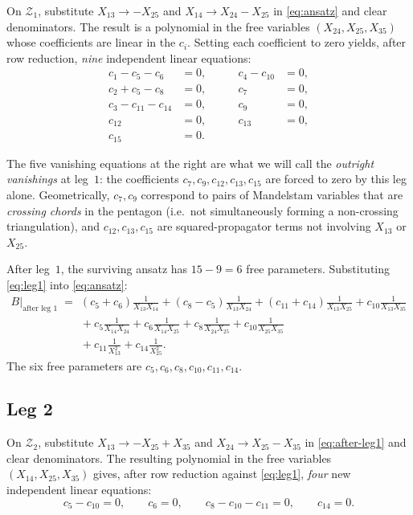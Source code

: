 \documentclass[11pt]{article}
\theoremstyle{plain}
\theoremstyle{definition}
\newcommand{\cZ}{\mathcal{Z}}
\begin{document}
On $\cZ_1$, substitute $X_{13} \to -X_{25}$ and $X_{14} \to X_{24} - X_{25}$ in
\eqref{eq:ansatz} and clear denominators. The result is a polynomial in the free
variables $(X_{24}, X_{25}, X_{35})$ whose coefficients are linear in the $c_i$.
Setting each coefficient to zero yields, after row reduction, \emph{nine} independent
linear equations:
\begin{equation}
\begin{aligned}
c_1 - c_5 - c_6 &= 0, &\qquad c_4 - c_{10} &= 0, \\
c_2 + c_5 - c_8 &= 0, &\qquad c_7 &= 0, \\
c_3 - c_{11} - c_{14} &= 0, &\qquad c_9 &= 0, \\
c_{12} &= 0, &\qquad c_{13} &= 0, \\
c_{15} &= 0. & &
\end{aligned}
\label{eq:leg1}
\end{equation}

The five vanishing equations at the right are what we will call the
\emph{outright vanishings} at leg~$1$: the coefficients $c_7, c_9, c_{12}, c_{13},
c_{15}$ are forced to zero by this leg alone. Geometrically, $c_7, c_9$ correspond to
pairs of Mandelstam variables that are \emph{crossing chords} in the pentagon
(i.e.\ not simultaneously forming a non-crossing triangulation), and $c_{12},
c_{13}, c_{15}$ are squared-propagator terms not involving $X_{13}$ or $X_{25}$.

After leg~$1$, the surviving ansatz has $15 - 9 = 6$ free parameters. Substituting
\eqref{eq:leg1} into \eqref{eq:ansatz}:
\begin{align}
B \Big|_{\text{after leg 1}} \;=\;
&\; (c_5 + c_6) \tfrac{1}{X_{13} X_{14}}
    + (c_8 - c_5) \tfrac{1}{X_{13} X_{24}}
    + (c_{11} + c_{14}) \tfrac{1}{X_{13} X_{25}}
    + c_{10} \tfrac{1}{X_{13} X_{35}} \nonumber \\
&\; + c_5 \tfrac{1}{X_{14} X_{24}}
    + c_6 \tfrac{1}{X_{14} X_{25}}
    + c_8 \tfrac{1}{X_{24} X_{25}}
    + c_{10} \tfrac{1}{X_{25} X_{35}} \nonumber \\
&\; + c_{11} \tfrac{1}{X_{13}^2} + c_{14} \tfrac{1}{X_{25}^2}.
\label{eq:after-leg1}
\end{align}
The six free parameters are $c_5, c_6, c_8, c_{10}, c_{11}, c_{14}$.

\subsection{Leg 2}

On $\cZ_2$, substitute $X_{13} \to -X_{25} + X_{35}$ and $X_{24} \to X_{25} - X_{35}$
in \eqref{eq:after-leg1} and clear denominators. The resulting polynomial in the free
variables $(X_{14}, X_{25}, X_{35})$ gives, after row reduction against \eqref{eq:leg1},
\emph{four} new independent linear equations:
\begin{equation}
c_5 - c_{10} = 0, \qquad c_6 = 0, \qquad c_8 - c_{10} - c_{11} = 0, \qquad c_{14} = 0.
\label{eq:leg2}
\end{equation}
\end{document}

